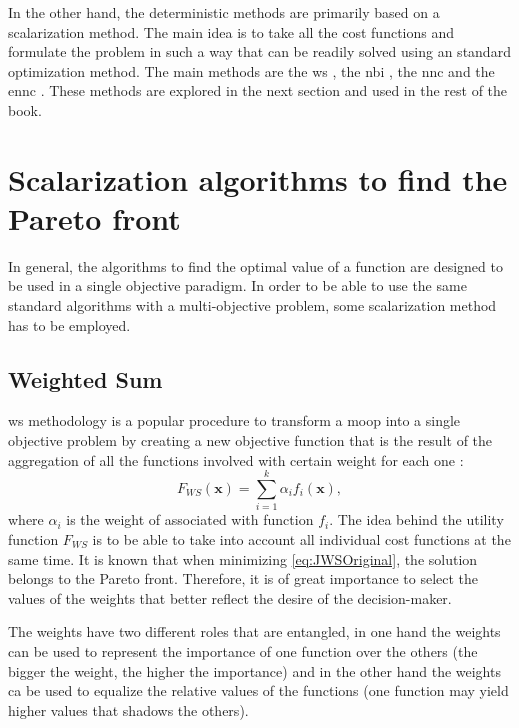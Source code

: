 In the other hand, the deterministic methods are primarily based on a scalarization method. The main idea is to take all the cost functions and formulate the problem in such a way that can be readily solved using an standard optimization method. The main methods are the \gls{ws} \citep{Marler2004}, the \gls{nbi} \citep{Das1998}, the \gls{nnc} \citep{Messac2003} and the \gls{ennc} \citep{Sanchis2008}. These methods are explored in the next section and used in the rest of the book.
\section{Scalarization algorithms to find the Pareto front}
\label{sec:design-methodologies}

In general, the algorithms to find the optimal value of a function are designed to be used in a single objective paradigm. In order to be able to use the same standard algorithms with a multi-objective problem, some scalarization method has to be employed.
%
\subsection{Weighted Sum}
\label{sec:WS}
\gls{ws} methodology is a popular procedure to transform a \gls{moop} into a single objective problem by creating a new objective function that is the result of the aggregation of all the functions involved with certain weight for each one \citep{Marler2004}:
%
\begin{equation}
F_{WS}(\mathbf{x}) = \sum_{i=1}^{k}\alpha_{i} {f}_{i}(\mathbf{x}),
\label{eq:JWSOriginal}
\end{equation}
%
where $\alpha_i$ is the weight of associated with function $f_i$. The idea behind the utility function $F_{WS}$ is to be able to take into account all individual cost functions at the same time. It is known that when minimizing \eqref{eq:JWSOriginal}, the solution belongs to the Pareto front. Therefore, it is of great importance to select the values of the weights that better reflect the desire of the decision-maker.

The weights have two different roles that are entangled, in one hand the weights can be used to represent the importance of one function over the others (the bigger the weight, the higher the importance) and in the other hand the weights ca be used to equalize the relative values of the functions (one function may yield higher values that shadows the others).

